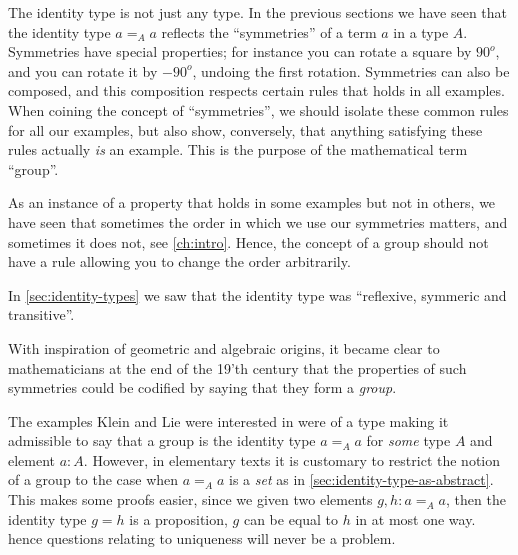 \label{ch:groups}

The identity type is not just any type.  In the previous sections we have seen that the identity type $a=_Aa$ reflects the ``symmetries'' of a term $a$ in a type $A$.  Symmetries have special properties; for instance you can rotate a square by $90^o$, and you can rotate it by $-90^o$, undoing the first rotation.
Symmetries can also be composed, and this composition respects certain rules that holds in all examples.  When coining the concept of ``symmetries'', we should isolate these common rules for all our examples, but also show, conversely, that anything satisfying these rules actually \emph{is} an example.  This is the purpose of the mathematical term ``group''.

As an instance of a property that holds in some examples but not in others, we have seen that sometimes the order in which we use our symmetries matters, and sometimes it does not, see \cref{ch:intro}.  Hence, the concept of a group should not have a rule allowing you to change the order arbitrarily.

In \cref{sec:identity-types} we saw that the identity type was ``reflexive, symmeric and transitive''.

With inspiration of geometric and algebraic origins, it became clear to mathematicians at the end of the 19'th century that the properties of such symmetries could be codified by saying that they form a \emph{group}.

The examples Klein and Lie were interested in were of a type making it admissible to say that a group is the identity type $a=_Aa$ for \emph{some} type $A$ and element $a:A$.
However, in elementary texts it is customary to restrict the notion of a group to the case when $a=_Aa$ is a \emph{set} as in \cref{sec:identity-type-as-abstract}.  This makes some proofs easier, since we given two elements $g,h:a=_Aa$, then the identity type $g=h$ is a proposition, \ie $g$ can be equal to $h$ in at most one way.  hence questions relating to uniqueness will never be a problem.


